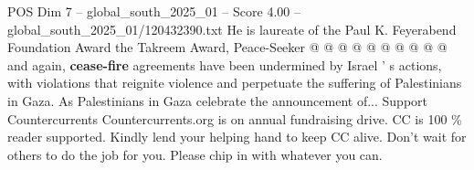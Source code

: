 \begin{textsample}{POS Dim 7 – global\_south\_2025\_01 – Score 4.00 – global\_south\_2025\_01/120432390.txt}
He is laureate of the Paul K.
Feyerabend Foundation Award the Takreem Award, Peace-Seeker @ @ @ @ @ @ @ @ @ @ and again, \textbf{cease-fire} agreements have been undermined by Israel ' s actions, with violations that reignite violence and perpetuate the suffering of Palestinians in Gaza.
As Palestinians in Gaza celebrate the announcement of...
Support Countercurrents Countercurrents.org is on annual fundraising drive.
CC is 100 \% reader supported.
Kindly lend your helping hand to keep CC alive.
Don't wait for others to do the job for you.
Please chip in with whatever you can.

\end{textsample}

